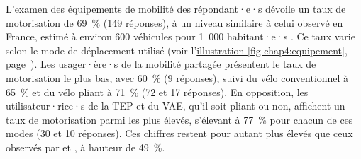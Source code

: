 \begin{refsegment}
L'examen des équipements de mobilité des répondant·e·s dévoile un taux de motorisation de 69~\% (149 réponses), à un niveau similaire à celui observé en France, estimé à environ 600 véhicules pour 1~000 habitant·e·s \textcolor{blue}{\autocite{insee_equipement_2020}}. Ce taux varie selon le mode de déplacement utilisé (voir l'\hyperref[fig-chap4:equipement]{illustration \ref{fig-chap4:equipement}}, page~\pageref{fig-chap4:equipement}). Les usager·ère·s de la mobilité partagée présentent le taux de motorisation le plus bas, avec 60~\% (9 réponses), suivi du vélo conventionnel à 65~\% et du vélo pliant à 71~\% (72 et 17 réponses). En opposition, les utilisateur·rice·s de la \acrshort{TEP} et du \acrshort{VAE}, qu'il soit pliant ou non, affichent un taux de motorisation parmi les plus élevés, s'élevant à 77~\% pour chacun de ces modes (30 et 10 réponses). Ces chiffres restent pour autant plus élevés que ceux observés par \textcolor{blue}{\textcite[362]{givoni_access_2007}} et \textcolor{blue}{\textcite[7]{yang_empirical_2016}}, à hauteur de 49~\%.%


\end{refsegment}
